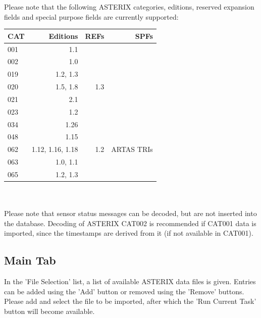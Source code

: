 Please note that the following ASTERIX categories, editions, reserved expansion fields and special purpose fields are currently supported: \\

\begin{tabular}{ | l | r | r | r |}
\hline
  CAT & Editions & REFs & SPFs  \\ \hline
  001 & 1.1 &  &  \\ \hline
  002 & 1.0 &  &  \\ \hline
  019 & 1.2, 1.3 & & \\ \hline
  020 & 1.5, 1.8 & 1.3 & \\ \hline
  021 & 2.1 & & \\ \hline
  023 & 1.2 & & \\ \hline
  034 & 1.26 & & \\ \hline
  048 & 1.15 & & \\ \hline
  062 & 1.12, 1.16, 1.18 & 1.2 & ARTAS TRIs \\ \hline
  063 & 1.0, 1.1 & & \\ \hline
  065 & 1.2, 1.3 & & \\ \hline
\end{tabular} \\
\  \\

Please note that sensor status messages can be decoded, but are not inserted into the database. Decoding of ASTERIX CAT002 is recommended if CAT001 data is imported, since the timestamps are derived from it (if not available in CAT001).

\subsection{Main Tab}

In the 'File Selection' list, a list of available ASTERIX data files is given. Entries can be added using the 'Add' button or removed using the 'Remove' buttons. \\

Please add and select the file to be imported, after which the 'Run Current Task' button will become available. \\

